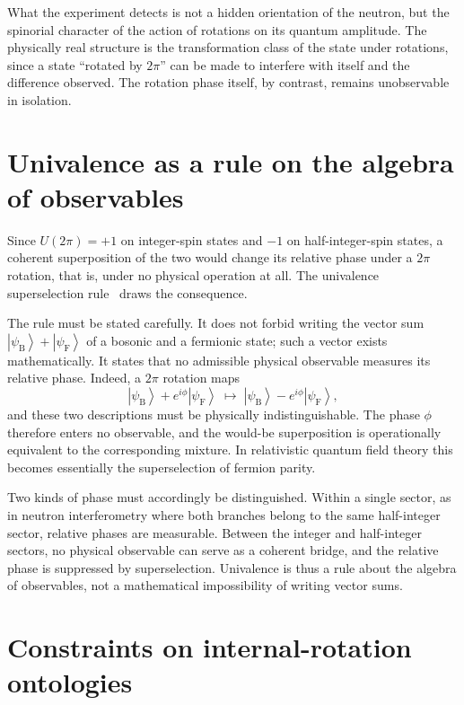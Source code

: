 \documentclass[11pt,a4paper]{article}
\newcommand{\ket}[1]{\left|#1\right\rangle}
\begin{document}
What the experiment detects is not a hidden orientation of the neutron, but the spinorial character of the
action of rotations on its quantum amplitude.
The physically real structure is the transformation class of the state under rotations, since a state
``rotated by $2\pi$'' can be made to interfere with itself and the difference observed.
The rotation phase itself, by contrast, remains unobservable in isolation.

\section{Univalence as a rule on the algebra of observables}
\label{sec:univalence}

Since $U(2\pi) = +1$ on integer-spin states and $-1$ on half-integer-spin states, a coherent superposition
of the two would change its relative phase under a $2\pi$ rotation, that is, under no physical operation at
all.
The univalence superselection rule~\cite{Wick1952} draws the consequence.

The rule must be stated carefully.
It does not forbid writing the vector sum $\ket{\psi_{\mathrm{B}}} + \ket{\psi_{\mathrm{F}}}$ of a bosonic
and a fermionic state; such a vector exists mathematically.
It states that no admissible physical observable measures its relative phase.
Indeed, a $2\pi$ rotation maps
\begin{equation}
\ket{\psi_{\mathrm{B}}} + e^{i\phi} \ket{\psi_{\mathrm{F}}}
\;\longmapsto\;
\ket{\psi_{\mathrm{B}}} - e^{i\phi} \ket{\psi_{\mathrm{F}}},
\label{eq:univalence}
\end{equation}
and these two descriptions must be physically indistinguishable.
The phase $\phi$ therefore enters no observable, and the would-be superposition is operationally equivalent
to the corresponding mixture.
In relativistic quantum field theory this becomes essentially the superselection of fermion parity.

Two kinds of phase must accordingly be distinguished.
Within a single sector, as in neutron interferometry where both branches belong to the same half-integer
sector, relative phases are measurable.
Between the integer and half-integer sectors, no physical observable can serve as a coherent bridge, and the
relative phase is suppressed by superselection.
Univalence is thus a rule about the algebra of observables, not a mathematical impossibility of writing
vector sums.

\section{Constraints on internal-rotation ontologies}
\label{sec:ontology}
\end{document}
